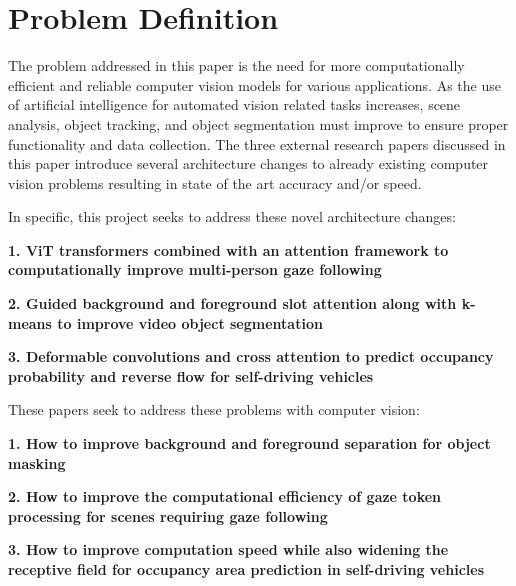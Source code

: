 \documentclass{article}
\theoremstyle{plain}
\theoremstyle{definition}
\theoremstyle{remark}
\begin{document}
\section*{Problem Definition}

\hspace{20pt} The problem addressed in this paper is the need for more computationally efficient and reliable computer vision models for various applications. As the use of artificial intelligence for automated vision related tasks increases, scene analysis, object tracking, and object segmentation must improve to ensure proper functionality and data collection. The three external research papers discussed in this paper introduce several architecture changes to already existing computer vision problems resulting in state of the art accuracy and/or speed. 

In specific, this project seeks to address these novel architecture changes:

\textbf{1.	ViT transformers combined with an attention framework to computationally improve multi-person gaze following}

\textbf{2.	Guided background and foreground slot attention along with k-means to improve video object segmentation}

\textbf{3.	Deformable convolutions and cross attention to predict occupancy probability and reverse flow for self-driving vehicles}

These papers seek to address these problems with computer vision:

\textbf{1.	How to improve background and foreground separation for object masking}

\textbf{2.	How to improve the computational efficiency of gaze token processing for scenes requiring gaze following}

\textbf{3.	How to improve computation speed while also widening the receptive field for occupancy area prediction in self-driving vehicles}
\end{document}
